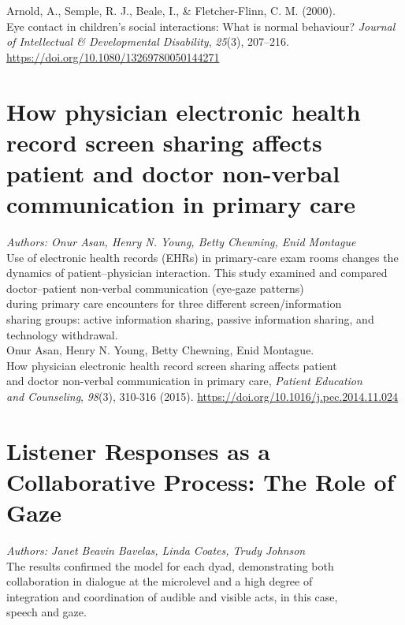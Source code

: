 \documentclass[12pt]{article}
\begin{document}
\noindent Arnold, A., Semple, R. J., Beale, I., \& Fletcher-Flinn, C. M. (2000).\\Eye contact in children’s social interactions: What is normal behaviour? \textit{Journal of Intellectual \& Developmental Disability}, \textit{25}(3), 207–216. \\\href{https://doi.org/10.1080/13269780050144271}{https://doi.org/10.1080/13269780050144271}

\section{How physician electronic health record screen sharing affects patient and doctor non-verbal communication in primary care}

\noindent\textit{Authors: Onur Asan, Henry N. Young, Betty Chewning, Enid Montague}\\

\noindent Use of electronic health records (EHRs) in primary-care exam rooms changes the dynamics of patient–physician interaction. This study examined and compared doctor–patient non-verbal communication (eye-gaze patterns)\\during primary care encounters for three different screen/information\\sharing groups: active information sharing, passive information sharing, and technology withdrawal.\\

\noindent Onur Asan, Henry N. Young, Betty Chewning, Enid Montague.\\How physician electronic health record screen sharing affects patient\\and doctor non-verbal communication in primary care, \textit{Patient Education\\and Counseling}, \textit{98}(3), 310-316 (2015). \href{https://www.sciencedirect.com/science/article/pii/S0738399114004972}{https://doi.org/10.1016/j.pec.2014.11.024}

\section{Listener Responses as a\\Collaborative Process: The Role of Gaze}

\noindent\textit{Authors: Janet Beavin Bavelas, Linda Coates, Trudy Johnson}\\

\noindent The results confirmed the model for each dyad, demonstrating both\\collaboration in dialogue at the microlevel and a high degree of\\integration and coordination of audible and visible acts, in this case,\\speech and gaze.\\
\end{document}
